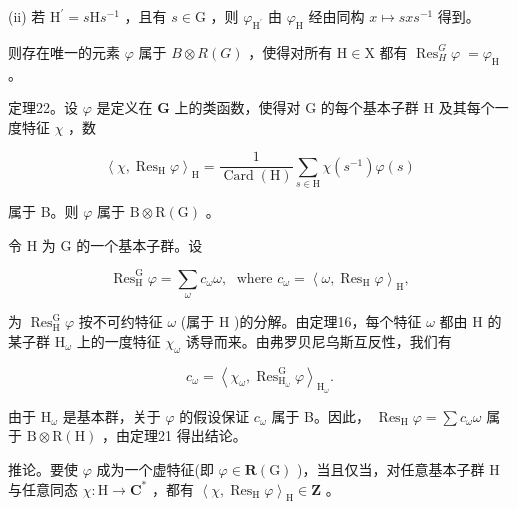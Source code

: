 \documentclass[10pt]{article}
\begin{document}
(ii) 若 \({\mathrm{H}}^{\prime } = s\mathrm{H}{s}^{-1}\) ，且有 \(s \in  \mathrm{G}\) ，则 \({\varphi }_{{\mathrm{H}}^{\prime }}\) 由 \({\varphi }_{\mathrm{H}}\) 经由同构 \(x \mapsto  {sx}{s}^{-1}\) 得到。

则存在唯一的元素 \(\varphi\) 属于 \(B \otimes  R\left( G\right)\) ，使得对所有 \(\mathrm{H} \in  \mathrm{X}\) 都有 \({\operatorname{Res}}_{H}^{G}\varphi \; = {\varphi }_{\mathrm{H}}\) 。

定理22。设 \(\varphi\) 是定义在 \(\mathbf{G}\) 上的类函数，使得对 \(\mathrm{G}\) 的每个基本子群 \(\mathrm{H}\) 及其每个一度特征 \(\chi\) ，数

\[
{\left\langle  \chi ,{\operatorname{Res}}_{\mathrm{H}}\varphi \right\rangle  }_{\mathrm{H}} = \frac{1}{\operatorname{Card}\left( \mathrm{H}\right) }\mathop{\sum }\limits_{{s \in  \mathrm{H}}}\chi \left( {s}^{-1}\right) \varphi \left( s\right)
\]

属于 B。则 \(\varphi\) 属于 \(\mathrm{B} \otimes  \mathrm{R}\left( \mathrm{G}\right)\) 。

令 \(\mathrm{H}\) 为 \(\mathrm{G}\) 的一个基本子群。设

\[
{\operatorname{Res}}_{\mathrm{H}}^{\mathrm{G}}\varphi  = \mathop{\sum }\limits_{\omega }{c}_{\omega }\omega ,\;\text{ where }{c}_{\omega } = {\left\langle  \omega ,{\operatorname{Res}}_{\mathrm{H}}\varphi \right\rangle  }_{\mathrm{H}},
\]

为 \({\operatorname{Res}}_{\mathrm{H}}^{\mathrm{G}}\varphi\) 按不可约特征 \(\omega\) (属于 \(\mathrm{H}\) )的分解。由定理16，每个特征 \(\omega\) 都由 \(\mathrm{H}\) 的某子群 \({\mathrm{H}}_{\omega }\) 上的一度特征 \({\chi }_{\omega }\) 诱导而来。由弗罗贝尼乌斯互反性，我们有

\[
{c}_{\omega } = {\left\langle  {\chi }_{\omega },{\operatorname{Res}}_{{\mathrm{H}}_{\omega }}^{\mathrm{G}}\varphi \right\rangle  }_{{\mathrm{H}}_{\omega }}.
\]

由于 \({\mathrm{H}}_{\omega }\) 是基本群，关于 \(\varphi\) 的假设保证 \({c}_{\omega }\) 属于 B。因此， \({\operatorname{Res}}_{\mathrm{H}}\varphi  = \sum {c}_{\omega }\omega\) 属于 \(\mathrm{B} \otimes  \mathrm{R}\left( \mathrm{H}\right)\) ，由定理21 得出结论。

推论。要使 \(\varphi\) 成为一个虚特征(即 \(\varphi  \in  \mathbf{R}\left( \mathrm{G}\right)\) )，当且仅当，对任意基本子群 \(\mathrm{H}\) 与任意同态 \(\chi  : \mathrm{H} \rightarrow  {\mathbf{C}}^{ * }\) ，都有 \({\left\langle  \chi ,{\operatorname{Res}}_{\mathrm{H}}\varphi \right\rangle  }_{\mathrm{H}} \in  \mathbf{Z}\) 。
\end{document}
